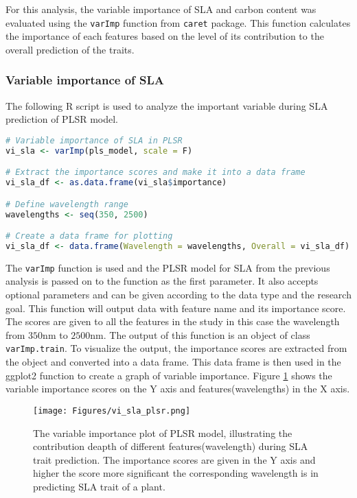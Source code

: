 \documentclass[12pt,a4paper]{report}
\begin{document}
For this analysis, the variable importance of SLA and carbon content was evaluated using the \texttt{varImp} function from \texttt{caret} package. This function calculates the importance of each features based on the level of its contribution to the overall prediction of the traits. \\ 

\subsubsection*{Variable importance of SLA}
The following R script is used to analyze the important variable during SLA prediction of PLSR model. \\

\begin{lstlisting}[language=R, style=mystyle]
# Variable importance of SLA in PLSR
vi_sla <- varImp(pls_model, scale = F)

# Extract the importance scores and make it into a data frame
vi_sla_df <- as.data.frame(vi_sla$importance)

# Define wavelength range
wavelengths <- seq(350, 2500)

# Create a data frame for plotting
vi_sla_df <- data.frame(Wavelength = wavelengths, Overall = vi_sla_df)
\end{lstlisting}

The \texttt{varImp} function is used and the PLSR model for SLA from the previous analysis is passed on to the function as the first parameter. It also accepts optional parameters and can be given according to the data type and the research goal. This function will output data with feature name and its importance score. The scores are given to all the features in the study in this case the wavelength from $350$nm to $2500$nm. The output of this function is an object of class \texttt{varImp.train}. To visualize the output, the importance scores are extracted from the object and converted into a data frame. This data frame is then used in the ggplot2 function to create a graph of variable importance. Figure \ref{fig:vi_sla_plsr} shows the variable importance scores on the Y axis and features(wavelengths) in the X axis.  \\

\begin{figure}[h]
    \centering
    \texttt{[image: Figures/vi\_sla\_plsr.png]}
    \caption{The variable importance plot of PLSR model, illustrating the contribution deapth of different features(wavelength) during SLA trait prediction. The importance scores are given in the Y axis and higher the score more significant the corresponding wavelength is in predicting SLA trait of a plant. }
    \label{fig:vi_sla_plsr}
\end{figure}
\end{document}
